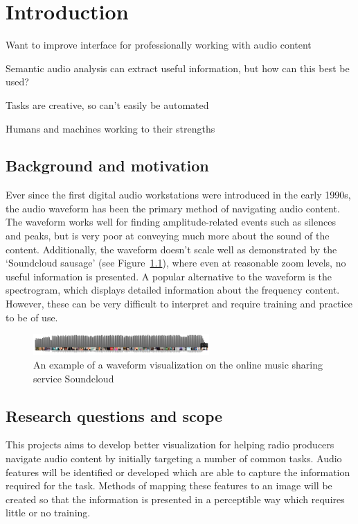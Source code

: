 \chapter{Introduction}\label{chp:intro}

Want to improve interface for professionally working with audio content

Semantic audio analysis can extract useful information, but how can this best be used?

Tasks are creative, so can't easily be automated

Humans and machines working to their strengths

\section{Background and motivation}\label{sec:intro-motivation}
Ever since the first digital audio workstations were introduced in the early
1990s, the audio waveform has been the primary method of navigating audio
content. The waveform works well for finding amplitude-related events such as
silences and peaks, but is very poor at conveying much more about the sound of
the content. Additionally, the waveform doesn't scale well as demonstrated by
the `Soundcloud sausage' (see Figure~\ref{fig:soundcloud}), where even at
reasonable zoom levels, no useful information is presented.  A popular
alternative to the waveform is the spectrogram, which displays detailed
information about the frequency content. However, these can be very difficult
to interpret and require training and practice to be of use.

\begin{figure}[ht]
  \centering
  \includegraphics[width=0.6\textwidth]{figs/soundcloud.png}
  \caption{An example of a waveform visualization on the online music sharing
    service Soundcloud}
  \label{fig:soundcloud}
\end{figure}

\section{Research questions and scope}\label{sec:intro-questions}
This projects aims to develop better visualization for helping radio producers
navigate audio content by initially targeting a number of common tasks. Audio
features will be identified or developed which are able to capture the
information required for the task. Methods of mapping these features to an
image will be created so that the information is presented in a perceptible way
which requires little or no training. 

